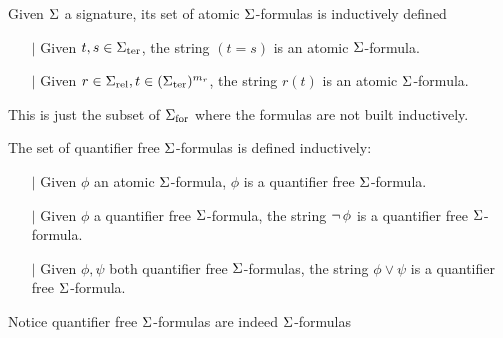 \begin{dfn}
    Given $\Sigma$ a signature, 
    its set of atomic $\Sigma$-formulas is inductively defined
    \begin{itemize}
        \item[$\vert$] Given $t, s \in {\Sigma}_\mathrm{ter}$, 
        the string $(t = s)$ is an atomic $\Sigma$-formula.
        \item[$\vert$] Given $r \in {\Sigma}_\mathrm{rel}, t \in ({\Sigma}_\mathrm{ter})^{m_r}$, 
        the string $r(t)$ is an atomic $\Sigma$-formula.
    \end{itemize}
    This is just the subset of ${\Sigma}_\mathrm{for}$ 
    where the formulas are not built inductively.
\end{dfn}

\begin{dfn}
    The set of quantifier free $\Sigma$-formulas is defined inductively:
    \begin{itemize}
        \item[$\vert$] Given $\phi$ an atomic $\Sigma$-formula,
            $\phi$ is a quantifier free $\Sigma$-formula.
        \item[$\vert$] Given $\phi$ a quantifier free $\Sigma$-formula, 
        the string $\neg\, \phi$ is a quantifier free $\Sigma$-formula. 
        \item[$\vert$] Given $\phi, \psi$ both quantifier free $\Sigma$-formulas, 
        the string $\phi \lor \psi$ is a quantifier free $\Sigma$-formula.
    \end{itemize}
    Notice quantifier free $\Sigma$-formulas are indeed $\Sigma$-formulas
\end{dfn}

